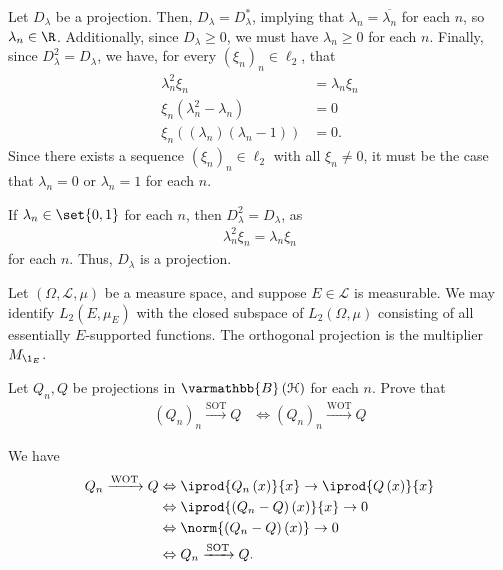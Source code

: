 \documentclass[10pt]{mypackage}
\renewcommand*{\mathbb}[1]{\varmathbb{#1}}
\newcommand{\B}{\mathbb{B}}
\begin{document}
\begin{solution}
  Let $D_{\lambda}$ be a projection. Then, $D_{\lambda} = D_{\lambda}^{\ast}$, implying that $\lambda_n = \overline{\lambda_n}$ for each $n$, so $\lambda_n \in \R$. Additionally, since $D_{\lambda} \geq 0$, we must have $\lambda_n \geq 0$ for each $n$. Finally, since $D_{\lambda}^2 = D_{\lambda}$, we have, for every $\left(\xi_n\right)_{n}\in \ell_2$, that
  \begin{align*}
    \lambda_n^2\xi_n &= \lambda_n\xi_n\\
    \xi_n\left(\lambda_n^2 - \lambda_n\right) &= 0\\
    \xi_n\left(\left(\lambda_n\right)\left(\lambda_n - 1\right)\right) &= 0.
  \end{align*}
  Since there exists a sequence $\left(\xi_n\right)_n\in \ell_2$ with all $\xi_n\neq 0$, it must be the case that $\lambda_n = 0$ or $\lambda_n = 1$ for each $n$.\newline

  If $\lambda_n \in\set{0,1}$ for each $n$, then $D_{\lambda}^2 = D_{\lambda}$, as
  \begin{align*}
    \lambda_n^2\xi_n = \lambda_n\xi_n
  \end{align*}
  for each $n$. Thus, $D_{\lambda}$ is a projection.
\end{solution}
\begin{example}
  Let $\left(\Omega,\mathcal{L},\mu\right)$ be a measure space, and suppose $E\in \mathcal{L}$ is measurable. We may identify $L_2\left(E,\mu_E\right)$ with the closed subspace of $L_2\left(\Omega,\mu\right)$ consisting of all essentially $E$-supported functions. The orthogonal projection is the multiplier $M_{\1_{E}}$.
\end{example}
\begin{exercise}
  Let $Q_n,Q$ be projections in $\B\left(\mathcal{H}\right)$ for each $n$. Prove that
  \begin{align*}
    \left(Q_n\right)_n\xrightarrow{\text{SOT}}Q &\Leftrightarrow \left(Q_n\right)_n\xrightarrow{\text{WOT}}Q
  \end{align*}
\end{exercise}
\begin{solution}
  We have
  \begin{align*}
    Q_n\xrightarrow{\text{WOT}}Q &\Leftrightarrow \iprod{Q_n\left(x\right)}{x} \rightarrow \iprod{Q\left(x\right)}{x}\\
                                 &\Leftrightarrow \iprod{\left(Q_n - Q\right)\left(x\right)}{x}\rightarrow 0\\
                                 &\Leftrightarrow \norm{\left(Q_n - Q\right)\left(x\right)}\rightarrow 0\\
                                 &\Leftrightarrow Q_n\xrightarrow{\text{SOT}}Q.
  \end{align*}
\end{solution}
\end{document}
